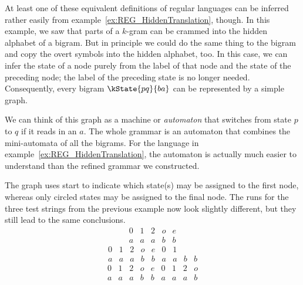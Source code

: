 At least one of these equivalent definitions of regular languages can be inferred rather easily from example~\ref{ex:REG_HiddenTranslation}, though.
In this example, we saw that parts of a $k$-gram can be crammed into the hidden alphabet of a bigram.
But in principle we could do the same thing to the bigram and copy the overt symbols into the hidden alphabet, too.
In this case, we can infer the state of a node purely from the label of that node and the state of the preceding node; the label of the preceding state is no longer needed.
Consequently, every bigram $\kState{p q}{b a}$ can be represented by a simple graph.
%
\begin{center}
    
\end{center}
%
We can think of this graph as a machine or \emph{automaton} that switches from state $p$ to $q$ if it reads in an $a$.
The whole grammar is an automaton that combines the mini-automata of all the bigrams.
For the language in example~\ref{ex:REG_HiddenTranslation}, the automaton is actually much easier to understand than the refined grammar we constructed.
%
\begin{center}
    
\end{center}
%
The graph uses start to indicate which state(s) may be assigned to the first node, whereas only circled states may be assigned to the final node.
The runs for the three test strings from the previous example now look slightly different, but they still lead to the same conclusions.
%
\[
    \begin{array}{ccccc}
            0 & 1 & 2 & o & e\\
            a & a & a & b & b 
    \end{array}
\]
\[ 
    \begin{array}{ccccccccc}
            0 & 1 & 2 & o & e & 0 & 1 & &\\
            a & a & a & b & b & a & a & b & b 
    \end{array}
\]
\[ 
    \begin{array}{ccccccccc}
            0 & 1 & 2 & o & e & 0 & 1 & 2 & o\\
            a & a & a & b & b & a & a & a & b 
    \end{array}
\]

